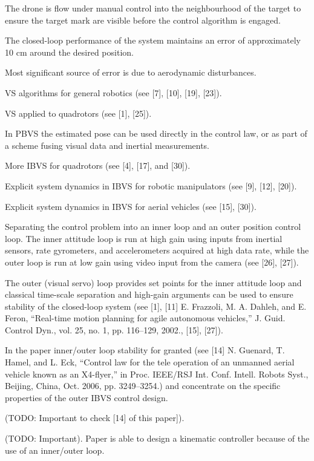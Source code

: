 The drone is flow under manual control into the neighbourhood of the target to ensure the target mark are visible before the control algorithm is engaged.

The closed-loop performance of the system maintains an error of approximately 10 cm around the desired position.

Most significant source of error is due to aerodynamic disturbances.

\cite{bourquardez_2009}

VS algorithms for general robotics (see [7], [10], [19], [23]).

VS applied to quadrotors (see [1], [25]).

In PBVS the estimated pose can be used directly in the control law, or as part of a scheme fusing visual data and inertial measurements.

More IBVS for quadrotors (see [4], [17], and [30]).

Explicit system dynamics in IBVS for robotic manipulators (see [9], [12], [20]).

Explicit system dynamics in IBVS for aerial vehicles (see [15], [30]).

Separating the control problem into an inner loop and an outer position control loop. The inner attitude loop is run at high gain using inputs from inertial sensors, rate gyrometers, and accelerometers acquired at high data rate, while the outer loop is run at low gain using video input from the camera (see [26], [27]).

The outer (visual servo) loop provides set points for the inner attitude loop and classical time-scale separation and high-gain arguments can be used to ensure stability of the closed-loop system (see [1], [11] E. Frazzoli, M. A. Dahleh, and E. Feron, “Real-time motion planning for agile autonomous vehicles,” J. Guid. Control Dyn., vol. 25, no. 1, pp. 116–129, 2002., [15], [27]).

In the paper inner/outer loop stability for granted (see [14] N. Guenard, T. Hamel, and L. Eck, “Control law for the tele operation of an unmanned aerial vehicle known as an X4-flyer,” in Proc. IEEE/RSJ Int. Conf. Intell. Robots Syst., Beijing, China, Oct. 2006, pp. 3249–3254.) and concentrate on the specific properties of the outer IBVS control design.

(TODO: Important to check [14] of this paper]).

(TODO: Important). Paper is able to design a kinematic controller because of the use of an inner/outer loop.

